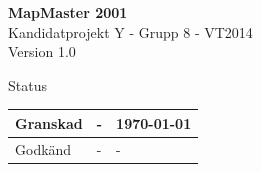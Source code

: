 \documentclass[a4paper,12pt,fleqn]{article}
\begin{document}
	\pagestyle{fancy}
	\vspace*{\fill}
		\begingroup
			\begin{center}
				\huge{\textbf{MapMaster 2001}}
				\\
				\vspace{5pt}
				\normalsize
				Kandidatprojekt Y - Grupp 8 - VT2014
				\\
				Version 1.0
				\end{center}
		\endgroup
	\vspace*{\fill}
	
	\begin{center} %
		Status
		\\
		\vspace{3pt} %
	    \begin{tabular}{| p{3cm} | p{3cm} | p{3cm} |} %
	    \hline %
	    Granskad & - & \today \\ \hline %
		Godkänd & - & - \\ \hline %

	    \end{tabular}
	\end{center}
	\vspace{2cm}
	\newpage
	
\end{document}
